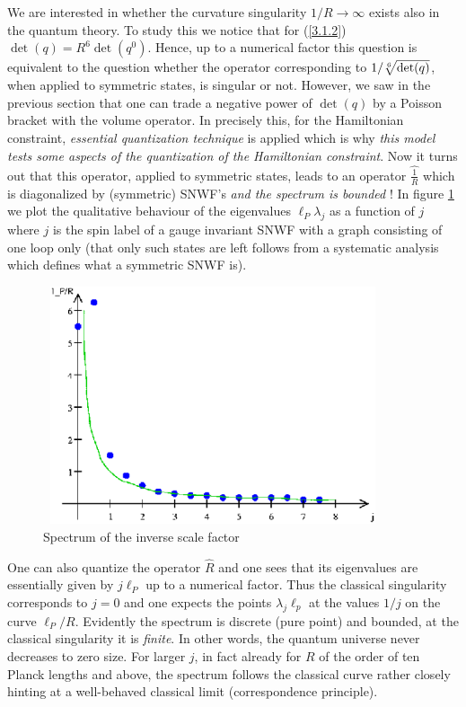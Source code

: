 \documentclass[12pt]{report}
\begin{document}
We are interested in whether the curvature singularity $1/R\to\infty$ exists 
also in the quantum theory. To study this we notice that for 
(\ref{3.1.2}) $\det(q)=R^6\det(q^0)$. Hence, up to a numerical factor 
this question is equivalent to the question whether the operator 
corresponding to $1/\root{6} \of{\det(q)}$, when applied to symmetric states,
is singular or not. However, we saw in the previous section that 
one can trade a negative power of $\det(q)$ by a Poisson bracket with the 
volume operator. In \cite{46} precisely this, for the Hamiltonian 
constraint, {\it essential quantization technique} is applied which is why
{\it this model tests some aspects of the quantization of the 
Hamiltonian 
constraint}. Now it turns out that this operator, applied to symmetric 
states, leads to an operator $\widehat{\frac{1}{R}}$ which is diagonalized 
by (symmetric) SNWF's {\it and the spectrum is bounded} ! In figure 
\ref{f12} we plot the qualitative behaviour of the eigenvalues 
$\ell_P\lambda_j$ as a function of $j$ where $j$ is the spin label of a 
gauge invariant SNWF with a graph consisting 
of one loop only (that only such states are left follows from a
systematic analysis which defines what a symmetric SNWF is).
%
\begin{figure}
\includegraphics[width=10cm,height=7cm]{proc9fig12.ps}
\caption{Spectrum of the inverse scale factor}
\label{f12}
\end{figure}
%
One can also quantize the operator $\hat{R}$ and one sees that its 
eigenvalues are essentially given by $j\ell_P$ up to a numerical factor. 
Thus the classical singularity corresponds to $j=0$ and one expects 
the points $\lambda_j\ell_p$ at the values $1/j$ on the curve $\ell_P/R$.
Evidently the spectrum is discrete (pure point) and bounded, at the 
classical singularity it is {\it finite}. In other words, the quantum 
universe never decreases to zero size. For larger $j$, in fact already for 
$R$ of the order of ten Planck lengths and above, the spectrum follows the 
classical curve rather closely hinting at a well-behaved classical 
limit (correspondence principle).
\end{document}
